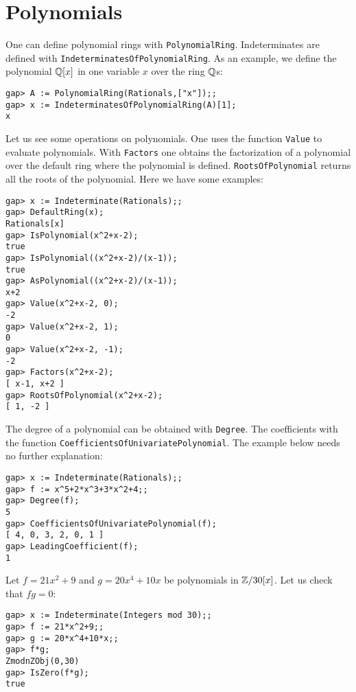 \section{Polynomials}

One can define polynomial rings with \lstinline{PolynomialRing}. Indeterminates
are defined with \lstinline{IndeterminatesOfPolynomialRing}. As an example, we
define the polynomial $\mathbb{Q}[x]$ in one variable $x$ over the ring $\mathbb{Q}$s:
\begin{lstlisting}
gap> A := PolynomialRing(Rationals,["x"]);;
gap> x := IndeterminatesOfPolynomialRing(A)[1];
x
\end{lstlisting}

Let us see some operations on polynomials.  One uses the function
\lstinline{Value} to evaluate polynomials. With \lstinline{Factors} one obtains
the factorization of a polynomial over the default ring where the polynomial is
defined. \lstinline{RootsOfPolynomial} returns all the roots of the polynomial.
Here we have some examples:
\begin{lstlisting}
gap> x := Indeterminate(Rationals);;
gap> DefaultRing(x);
Rationals[x]
gap> IsPolynomial(x^2+x-2);
true
gap> IsPolynomial((x^2+x-2)/(x-1));
true
gap> AsPolynomial((x^2+x-2)/(x-1));
x+2
gap> Value(x^2+x-2, 0);
-2
gap> Value(x^2+x-2, 1);
0
gap> Value(x^2+x-2, -1);
-2
gap> Factors(x^2+x-2);
[ x-1, x+2 ]
gap> RootsOfPolynomial(x^2+x-2);
[ 1, -2 ]
\end{lstlisting}

The degree of a polynomial can be obtained with \lstinline{Degree}.  The
coefficients with the function \lstinline{CoefficientsOfUnivariatePolynomial}.
The example below needs no further explanation:
\begin{lstlisting}
gap> x := Indeterminate(Rationals);;
gap> f := x^5+2*x^3+3*x^2+4;;
gap> Degree(f);
5
gap> CoefficientsOfUnivariatePolynomial(f);
[ 4, 0, 3, 2, 0, 1 ]
gap> LeadingCoefficient(f);
1
\end{lstlisting}



\begin{example}
	Let $f=21x^2+9$ and $g=20x^4+10x$ be polynomials in $\mathbb{Z}/30[x]$. Let us
	check that $fg=0$:
\begin{lstlisting}
gap> x := Indeterminate(Integers mod 30);;
gap> f := 21*x^2+9;;
gap> g := 20*x^4+10*x;;
gap> f*g;
ZmodnZObj(0,30)
gap> IsZero(f*g);
true
\end{lstlisting}
\end{example}

